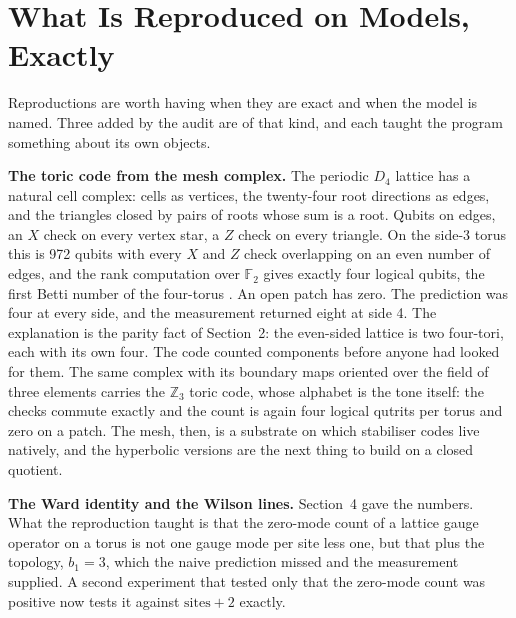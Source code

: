\section{What Is Reproduced on Models, Exactly}
\label{sec:models}

Reproductions are worth having when they are exact and when the model is named. Three added by the audit are of that
kind, and each taught the program something about its own objects.

\textbf{The toric code from the mesh complex.} The periodic $D_4$ lattice has a natural cell complex: cells as
vertices, the twenty-four root directions as edges, and the triangles closed by pairs of roots whose sum is a root.
Qubits on edges, an $X$ check on every vertex star, a $Z$ check on every triangle. On the side-3 torus this is 972
qubits with every $X$ and $Z$ check overlapping on an even number of edges, and the rank computation over
$\mathbb{F}_2$ gives exactly four logical qubits, the first Betti number of the four-torus \cite{kitaev2003,
dennis2002}. An open patch has zero. The prediction was four at every side, and the measurement returned eight at
side 4. The explanation is the parity fact of Section~2: the even-sided lattice is two four-tori, each with its own
four. The code counted components before anyone had looked for them. The same complex with its boundary maps oriented
over the field of three elements carries the $\mathbb{Z}_3$ toric code, whose alphabet is the tone itself: the
checks commute exactly and the count is again four logical qutrits per torus and zero on a patch. The mesh, then, is a substrate on which
stabiliser codes live natively, and the hyperbolic versions \cite{breuckmann2016} are the next thing to build on a
closed quotient.

\textbf{The Ward identity and the Wilson lines.} Section~4 gave the numbers. What the reproduction taught is that the
zero-mode count of a lattice gauge operator on a torus is not one gauge mode per site less one, but that plus the
topology, $b_1 = 3$, which the naive prediction missed and the measurement supplied. A second experiment that tested only
that the zero-mode count was positive now tests it against $\text{sites} + 2$ exactly.

